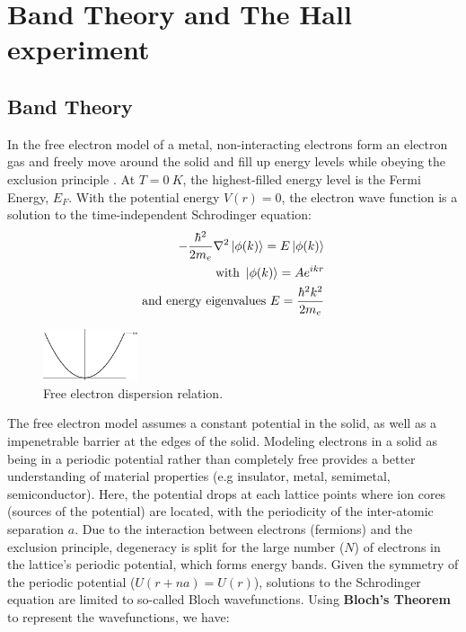 \section{\label{sec:electronicMatter}Band Theory and The Hall experiment}

\subsection*{\label{ssec:free-electron}Band Theory}

In the free electron model of a metal, non-interacting electrons form an electron gas and freely move around the solid and fill up energy levels while obeying the exclusion principle \cite{kittel_introduction_2004}. At $T = 0\ K$, the highest-filled energy level is the Fermi Energy, $E_F$. With the potential energy $V(r) = 0$, the electron wave function is a solution to the time-independent Schrodinger equation: 
\begin{align}
    -\dfrac{\hbar^{2}}{2m_e}\nabla^{2}\ket*{\phi(k)} = E\ket*{\phi(k)} \\
    \text{with } \ket*{\phi(k)} = A e^{i k r} \\
    \text{and energy eigenvalues } E = \dfrac{\hbar^{2}k^{2}}{2m_e}
    \label{eq:3dHamiltonian}
\end{align}

\begin{figure}[thpb] %
    \centering
    \includegraphics[width=0.25\textwidth]{figs/ek-free.eps}
    \caption{\label{fig:ek-free}Free electron dispersion relation.}
\end{figure}

The free electron model assumes a constant potential in the solid, as well as a impenetrable barrier at the edges of the solid. Modeling electrons in a solid as being in a periodic potential rather than completely free provides a better understanding of material properties (e.g insulator, metal, semimetal, semiconductor). Here, the potential drops at each lattice points where  ion cores (sources of the potential) are located, with the periodicity of the inter-atomic separation $a$. Due to the interaction between electrons (fermions) and the exclusion principle, degeneracy is split for the large number ($N$) of electrons in the lattice's periodic potential, which forms energy bands. Given the symmetry of the periodic potential ($U(r + na) = U(r)$), solutions to the Schrodinger equation are limited to so-called Bloch wavefunctions. Using \textbf{Bloch's Theorem} to represent the  wavefunctions, we have:

